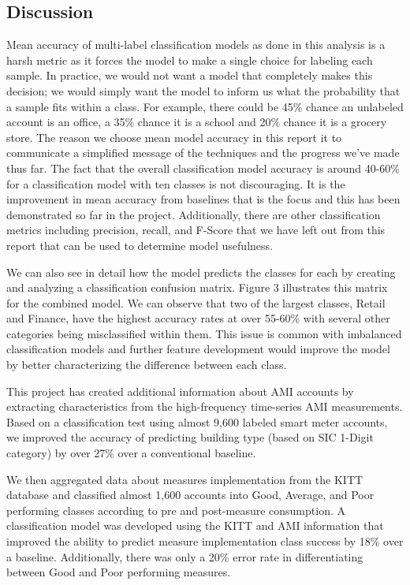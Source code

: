 \subsection{Discussion}
\label{sec:scalabilitydiscussion}

Mean accuracy of multi-label classification models as done in this analysis is a harsh metric as it forces the model to make a single choice for labeling each sample. In practice, we would not want a model that completely makes this decision; we would simply want the model to inform us what the probability that a sample fits within a class. For example, there could be 45\% chance an unlabeled account is an office, a 35\% chance it is a school and 20\% chance it is a grocery store. The reason we choose mean model accuracy in this report it to communicate a simplified message of the techniques and the progress we’ve made thus far. The fact that the overall classification model accuracy is around 40-60\% for a classification model with ten classes is not discouraging. It is the improvement in mean accuracy from baselines that is the focus and this has been demonstrated so far in the project. Additionally, there are other classification metrics including precision, recall, and F-Score that we have left out from this report that can be used to determine model usefulness. 

We can also see in detail how the model predicts the classes for each by creating and analyzing a classification confusion matrix. Figure 3 illustrates this matrix for the combined model. We can observe that two of the largest classes, Retail and Finance, have the highest accuracy rates at over 55-60\% with several other categories being misclassified within them.  This issue is common with imbalanced classification models and further feature development would improve the model by better characterizing the difference between each class.


This project has created additional information about AMI accounts by extracting characteristics from the high-frequency time-series AMI measurements. Based on a classification test using almost 9,600 labeled smart meter accounts, we improved the accuracy of predicting building type (based on SIC 1-Digit category) by over 27\% over a conventional baseline. 

We then aggregated data about measures implementation from the KITT database and classified almost 1,600 accounts into Good, Average, and Poor performing classes according to pre and post-measure consumption. A classification model was developed using the KITT and AMI information that improved the ability to predict measure implementation class success by 18\% over a baseline. Additionally, there was only a 20\% error rate in differentiating between Good and Poor performing measures.

